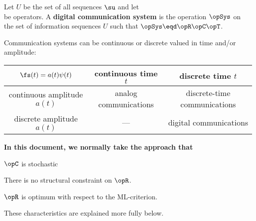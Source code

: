 \begin{definition}
\label{def:comsys}
Let $U$ be the set of all sequences $\su$ and let
\\
be operators.
A {\bf digital communication system} is the operation $\opSys$
on the set of information sequences $U$ such that
$\opSys \eqd \opR\opC\opT$.
\end{definition}

Communication systems can be continuous or discrete valued in
time and/or amplitude:

   \begin{tabular}{|c||c|c|}
      \hline
         $\fs(t)=a(t)\psi(t)$   &  continuous time $t$      & discrete time $t$   \\
      \hline
      \hline
         continuous amplitude $a(t)$ & analog communications   & discrete-time communications  \\
      \hline
         discrete amplitude $a(t)$   &---                    & digital communications \\
      \hline
   \end{tabular}

{\bf In this document, we normally take the approach that}
\begin{enume}
   \item $\opC$ is stochastic
   \item There is no structural constraint on $\opR$.
   \item $\opR$ is optimum with respect to the ML-criterion.
\end{enume}
These characteristics are explained more fully below.

